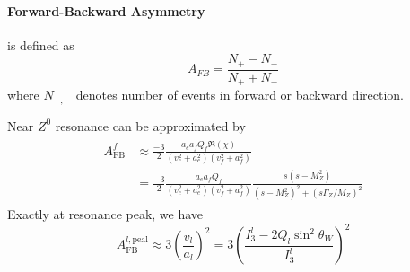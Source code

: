 \paragraph{Forward-Backward Asymmetry} is defined as 
\begin{equation}
	A_{FB} = \frac{N_+ - N_-}{N_+ + N_-}
	\label{math:AFBdef}
\end{equation}
where $N_{+,-}$ denotes number of events in forward or backward direction.

Near $Z^0$ resonance can be approximated by~\cite{manual}
\begin{align}
	\begin{split}
	A_\text{FB}^f &\approx \frac{-3}{2} \frac{a_e a_f Q_f \Re(\chi)}{(v_e^2 + a_e^2) (v_f^2 + a_f^2)} \\
	&=  \frac{-3}{2} \frac{a_e a_f Q_f }{(v_e^2 + a_e^2) (v_f^2 + a_f^2)} \frac{s(s-M_Z^2)}{(s-M_Z^2)^2 + (s \Gamma_Z / M_Z)^2 }
	\end{split}
	\label{math:AFBgen}
\end{align}
Exactly at resonance peak, we have
\begin{equation}
	A_\text{FB}^{l,\text{peal}} \approx 3 \left( \frac{v_l}{a_l} \right)^2 = 3 \left( \frac{I_3^l - 2 Q_l \sin^2\theta_W}{I_3^l} \right)^2
	\label{math:AFBpeak}
\end{equation}
